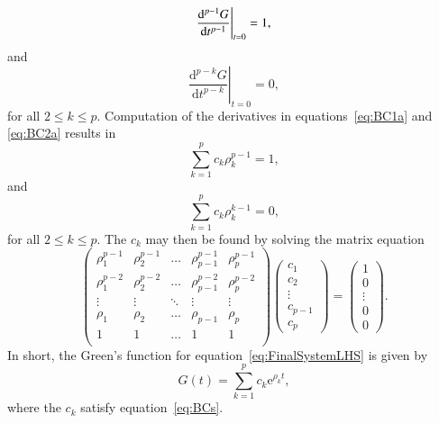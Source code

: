 \documentclass[a4paper,fleqn,usenatbib]{mnras}
\begin{document}
\begin{equation}\label{eq:BC1a}
 \left.\frac{\mathrm{d}^{p-1}G}{\mathrm{d}t^{p-1}}\right|_{t = 0} = 1,\\
\end{equation}
and
\begin{equation}\label{eq:BC2a}
 \left.\frac{\mathrm{d}^{p-k}G}{\mathrm{d}t^{p-k}}\right|_{t = 0} = 0,
\end{equation}
for all $2 \leq k \leq p$. Computation of the derivatives in equations~\eqref{eq:BC1a} and \eqref{eq:BC2a} results in
\begin{equation}\label{eq:BC1b}
 \sum_{k = 1}^{p} c_{k} \rho_{k}^{p-1} = 1,
 \end{equation}
 and
\begin{equation}\label{eq:BC2b}
 \sum_{k = 1}^{p} c_{k} \rho_{k}^{k-1} = 0,
\end{equation}
for all $2 \leq k \leq p$. The $c_{k}$ may then be found by solving the matrix equation
\begin{equation}\label{eq:BCs}
\left( \begin{array}{ccccc} 
\rho_{1}^{p-1} & \rho_{2}^{p-1} & \hdots & \rho_{p-1}^{p-1} & \rho_{p}^{p-1} \\
\rho_{1}^{p-2} & \rho_{2}^{p-2} & \hdots & \rho_{p-1}^{p-2} & \rho_{p}^{p-2} \\
\vdots & \vdots & \ddots & \vdots & \vdots \\
\rho_{1} & \rho_{2} & \hdots & \rho_{p-1} & \rho_{p} \\
1 & 1 & \hdots & 1 & 1 \\
\end{array}\right) \left( \begin{array}{c} c_{1} \\ c_{2} \\ \vdots \\ c_{p-1} \\ c_{p} \end{array} \right) = \left( \begin{array}{c} 1 \\ 0 \\ \vdots \\ 0 \\ 0 \end{array} \right).
\end{equation}
In short, the Green's function for equation~\eqref{eq:FinalSystemLHS} is given by 
\begin{equation}\label{eq:GreenSol}
G(t) = \sum_{k = 1}^{p} c_{k} \mathrm{e}^{\rho_{k}t},
\end{equation}
where the $c_{k}$ satisfy equation~\eqref{eq:BCs}.
\end{document}

